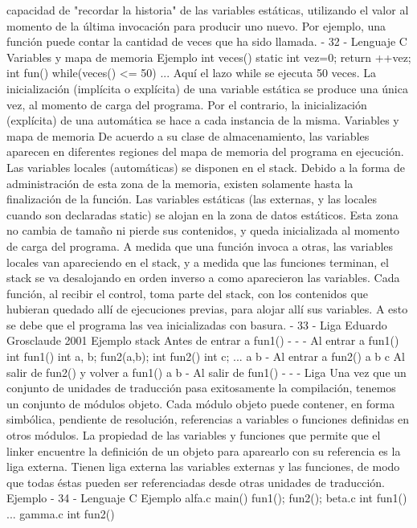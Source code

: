 capacidad de "recordar la historia" de las variables estáticas, utilizando el valor al momento de la
última invocación para producir uno nuevo. Por ejemplo, una función puede contar la cantidad de
veces que ha sido llamada.
- 32 -
Lenguaje C
Variables y mapa de memoria
Ejemplo
int veces()
{
static int vez=0;
return ++vez;
}
int fun()
{
while(veces() <= 50) {
...
}
}
Aquí el lazo while se ejecuta 50 veces.
La inicialización (implícita o explícita) de una variable estática se produce una única vez, al momento
de carga del programa. Por el contrario, la inicialización (explícita) de una automática se hace a cada
instancia de la misma.
Variables y mapa de memoria
De acuerdo a su clase de almacenamiento, las variables aparecen en diferentes regiones del mapa de
memoria del programa en ejecución.
Las variables locales (automáticas) se disponen en el stack.
Debido a la forma de administración de esta zona de la
memoria, existen solamente hasta la finalización de la
función.
Las variables estáticas (las externas, y las locales cuando
son declaradas static) se alojan en la zona de datos
estáticos. Esta zona no cambia de tamaño ni pierde sus
contenidos, y queda inicializada al momento de carga del
programa.
A medida que una función invoca a otras, las variables locales van apareciendo en el stack, y a medida
que las funciones terminan, el stack se va desalojando en orden inverso a como aparecieron las
variables. Cada función, al recibir el control, toma parte del stack, con los contenidos que hubieran
quedado allí de ejecuciones previas, para alojar allí sus variables. A esto se debe que el programa las
vea inicializadas con basura.
- 33 -
Liga
Eduardo Grosclaude 2001
Ejemplo
stack
Antes de entrar a fun1()
-
-
-
Al entrar a fun1()
int fun1()
{
int a, b;
fun2(a,b);
}
int fun2()
{
int c;
...
}
a
b
-
Al entrar a fun2()
a
b
c
Al salir de fun2() y volver a fun1()
a
b
-
Al salir de fun1()
-
-
-
Liga
Una vez que un conjunto de unidades de traducción pasa exitosamente la compilación, tenemos un
conjunto de módulos objeto. Cada módulo objeto puede contener, en forma simbólica, pendiente de
resolución, referencias a variables o funciones definidas en otros módulos.
La propiedad de las variables y funciones que permite que el linker encuentre la definición de un
objeto para aparearlo con su referencia es la liga externa. Tienen liga externa las variables externas y
las funciones, de modo que todas éstas pueden ser referenciadas desde otras unidades de traducción.
Ejemplo
- 34 -
Lenguaje C
Ejemplo
alfa.c
main()
{
fun1();
fun2();
}
beta.c
int fun1()
{
...
}
gamma.c
int fun2()
